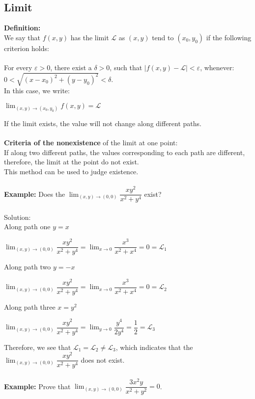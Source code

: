 \documentclass[UTF8,a4paper, 10pt, openany]{svmono}
\begin{document}
\subsection{Limit}
\textbf{Definition:}\\
We say that $f(x,y)$ has the limit $\mathcal{L}$ as $(x,y)$ tend to $(x_0,y_0)$ if the following criterion holds:
\\ \\For every $\varepsilon > 0$, there exist a $\delta >0$, such that $|f(x,y)-\mathcal{L}|<\varepsilon $, whenever: $0<\sqrt{(x-x_0)^2+(y-y_0)^2}<\delta$. \\
In this case, we write:
\begin{center}
$\displaystyle\lim_{(x,y) \to (x_0,y_0)} f(x,y) = \mathcal{L}$
\end{center}
If the limit exists, the value will not change along different paths.\\ \\
\textbf{Criteria of the nonexistence} of the limit at one point:\\
If along two different paths, the values corresponding to each path are different, therefore, the limit at the point do not exist.\\
This method can be used to judge existence.\\ \\
\textbf{Example:} Does the $\displaystyle\lim_{(x,y) \to (0,0)} \dfrac{xy^2}{x^2+y^4}$ exist?\\ \\Solution:\\
Along path one $y=x$
\begin{center}
$\displaystyle\lim_{(x,y) \to (0,0)} \dfrac{xy^2}{x^2+y^4}=\displaystyle\lim_{x \to 0} \dfrac{x^3}{x^2+x^4}=0=\mathcal{L}_1$
\end{center}
Along path two $y=-x$
\begin{center}
$\displaystyle\lim_{(x,y) \to (0,0)} \dfrac{xy^2}{x^2+y^4}=\displaystyle\lim_{x \to 0} \dfrac{x^3}{x^2+x^4}=0=\mathcal{L}_2$
\end{center}
Along path three $x=y^2$
\begin{center}
$\displaystyle\lim_{(x,y) \to (0,0)} \dfrac{xy^2}{x^2+y^4}=\displaystyle\lim_{y \to 0}\dfrac{y^4}{2y^4}=\dfrac{1}{2}=\mathcal{L}_3$
\end{center}
Therefore, we see that $\mathcal{L}_1=\mathcal{L}_2 \neq \mathcal{L}_3$, which indicates that the $\lim_{(x,y) \to (0,0)} \dfrac{xy^2}{x^2+y^4}$ does not exist.\\ \\
\textbf{Example:}  Prove that $\displaystyle\lim_{(x,y) \to (0,0)} \dfrac{3x^2y }{x^2+y^2}=0$.\\ \\
\end{document}
